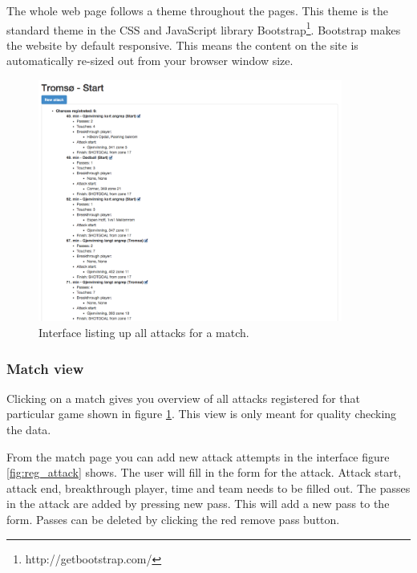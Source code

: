 The whole web page follows a theme throughout the pages. This theme is the standard theme in the \ac{CSS} and JavaScript library Bootstrap\footnote{ http://getbootstrap.com/}. Bootstrap makes the website by default responsive. This means the content on the site is automatically re-sized out from your browser window size.


\begin{figure}[ht!]
\centering
\includegraphics[width=100mm]{images/general/all_attacks.png}
\caption{Interface listing up all attacks for a match.}
\label{fig:all_attacks}
\end{figure}

\subsubsection{Match view}

Clicking on a match gives you overview of all attacks registered for that particular game shown in figure \ref{fig:all_attacks}. This view is only meant for quality checking the data.

From the match page you can add new attack attempts in the interface figure \ref{fig:reg_attack} shows. The user will fill in the form for the attack. Attack start, attack end, breakthrough player, time and team needs to be filled out. The passes in the attack are added by pressing new pass. This will add a new pass to the form. Passes can be deleted by clicking the red remove pass button. 

